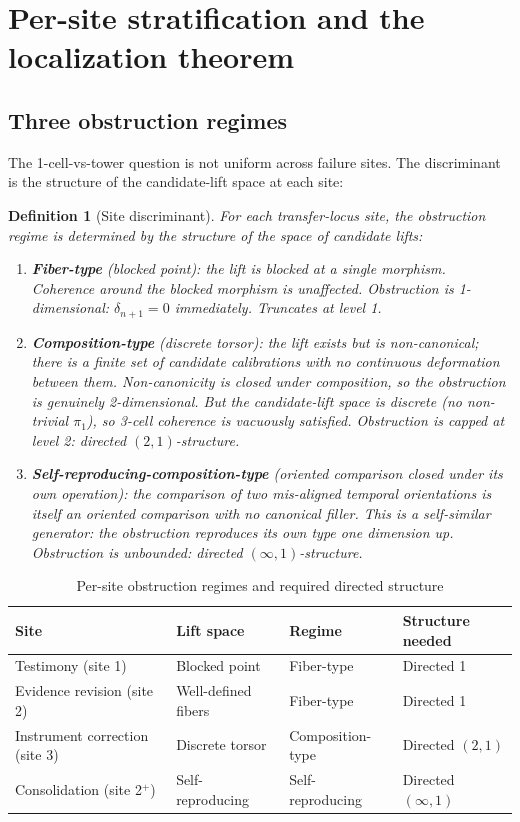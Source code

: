 \documentclass[11pt]{article}
\newtheorem{definition}{Definition}
\begin{document}
\section{Per-site stratification and the localization theorem}

\subsection{Three obstruction regimes}

The 1-cell-vs-tower question is not uniform across failure sites. The discriminant is the
structure of the candidate-lift space at each site:

\begin{definition}[Site discriminant]
\label{def:site-discriminant}
For each transfer-locus site, the obstruction regime is determined by the structure of the
space of candidate lifts:
\begin{enumerate}
  \item \textbf{Fiber-type} (blocked point): the lift is blocked at a single morphism.
  Coherence around the blocked morphism is unaffected. Obstruction is 1-dimensional:
  $\delta_{n+1} = 0$ immediately. Truncates at level 1.

  \item \textbf{Composition-type} (discrete torsor): the lift exists but is non-canonical;
  there is a finite set of candidate calibrations with no continuous deformation between them.
  Non-canonicity is closed under composition, so the obstruction is genuinely 2-dimensional.
  But the candidate-lift space is discrete (no non-trivial $\pi_1$), so 3-cell coherence is
  vacuously satisfied. Obstruction is capped at level 2: directed $(2,1)$-structure.

  \item \textbf{Self-reproducing-composition-type} (oriented comparison closed under its own
  operation): the comparison of two mis-aligned temporal orientations is itself an oriented
  comparison with no canonical filler. This is a self-similar generator: the obstruction
  reproduces its own type one dimension up. Obstruction is unbounded: directed $(\infty,1)$-structure.
\end{enumerate}
\end{definition}

\begin{table}[h]
\centering
\begin{tabular}{|l|l|l|l|}
\hline
\textbf{Site} & \textbf{Lift space} & \textbf{Regime} & \textbf{Structure needed} \\
\hline
Testimony (site 1) & Blocked point & Fiber-type & Directed 1 \\
Evidence revision (site 2) & Well-defined fibers & Fiber-type & Directed 1 \\
Instrument correction (site 3) & Discrete torsor & Composition-type & Directed $(2,1)$ \\
Consolidation (site 2$^+$) & Self-reproducing & Self-reproducing & Directed $(\infty,1)$ \\
\hline
\end{tabular}
\caption{Per-site obstruction regimes and required directed structure}
\label{tab:site-regimes}
\end{table}
\end{document}
